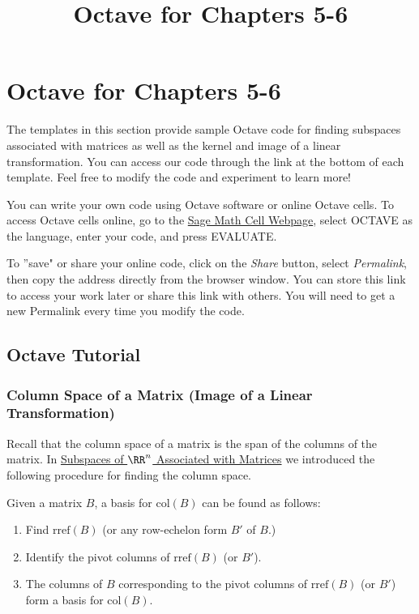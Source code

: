 \documentclass{ximera}
\title{Octave for Chapters 5-6} \license{CC BY-NC-SA 4.0}
\begin{document}
 
\begin{abstract}
\end{abstract}
\maketitle
 
\section*{Octave for Chapters 5-6}
 
The templates in this section provide sample Octave code for finding subspaces associated with matrices as well as the kernel and image of a linear transformation. You can access our code through the link at the bottom of each template.  Feel free to modify the code and experiment to learn more! 
 
You can write your own code using Octave software or online Octave cells.  To access Octave cells online, go to the \href{https://sagecell.sagemath.org/}{Sage Math Cell Webpage}, select OCTAVE as the language, enter your code, and press EVALUATE. 
 
To ''save" or share your online code, click on the \emph{Share} button, select \emph{Permalink}, then copy the address directly from the browser window.  You can store this link to access your work later or share this link with others.  You will need to get a new Permalink every time you modify the code.
 
\subsection*{Octave Tutorial}
\subsubsection*{Column Space of a Matrix (Image of a Linear Transformation)}
Recall that the column space of a matrix is the span of the columns of the matrix.  In \href{https://ximera.osu.edu/linearalgebradzv3/LinearAlgebraInteractiveIntro/VSP-0040/main}{Subspaces of $\RR^n$ Associated with Matrices} we introduced the following procedure for finding the column space.
 
\begin{procedure}[\ref{proc:colspace}]
Given a matrix $B$, a basis for $\mbox{col}(B)$ can be found as follows:
\begin{enumerate}
\item Find $\mbox{rref}(B)$ (or any row-echelon form $B'$ of $B$.)
\item Identify the pivot columns of $\mbox{rref}(B)$ (or $B'$).
\item The columns of $B$ corresponding to the pivot columns of $\mbox{rref}(B)$ (or $B'$) form a basis for $\mbox{col}(B)$.
\end{enumerate}
\end{procedure}
 
\end{document}
